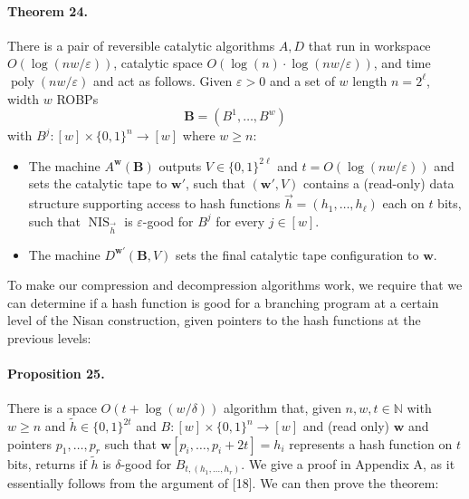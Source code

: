 \documentclass[10pt,a4paper]{article}
\begin{document}
\paragraph{Theorem 24.} There is a pair of reversible catalytic algorithms $A,D$ that run in workspace $O(\log(nw/\varepsilon))$, catalytic space $O(\log(n)\cdot\log(nw/\varepsilon))$, and time $\operatorname{poly}(nw/\varepsilon)$ and act as follows. Given $\varepsilon>0$ and a set of $w$ length $n=2^\ell$, width $w$ ROBPs
\[\mathbf B=(B^1,\ldots,B^w)\]
with $B^j:[w]\times\{0,1\}^n\to[w]$ where $w\geq n$:
\begin{itemize}
\item The machine $A^{\mathbf w}(\mathbf B)$ outputs $V\in\{0,1\}^{2\ell}$ and $t=O(\log(nw/\varepsilon))$ and sets the catalytic tape to $\mathbf w'$, such that $(\mathbf w',V)$ contains a (read-only) data structure supporting access to hash functions $\vec h=(h_1,\ldots,h_\ell)$ each on $t$ bits, such that $\operatorname{NIS}_{\vec h}$ is $\varepsilon$-good for $B^j$ for every $j\in[w]$.
\item The machine $D^{\mathbf w'}(\mathbf B,V)$ sets the final catalytic tape configuration to $\mathbf w$.
\end{itemize}
To make our compression and decompression algorithms work, we require that we can determine if a hash function is good for a branching program at a certain level of the Nisan construction, given pointers to the hash functions at the previous levels:
\paragraph{Proposition 25.} There is a space $O(t+\log(w/\delta))$ algorithm that, given $n,w,t\in\mathbb N$ with $w\geq n$ and $\widetilde h\in\{0,1\}^{2t}$ and $B:[w]\times\{0,1\}^n\to[w]$ and (read only) $\mathbf w$ and pointers $p_1,\ldots,p_r$ such that $\mathbf w[p_i,\ldots,p_i+2t]=h_i$ represents a hash function on $t$ bits, returns if $\widetilde h$ is $\delta$-good for $B_{t,(h_1,\ldots,h_r)}$.
We give a proof in Appendix A, as it essentially follows from the argument of [18]. We can then prove the theorem:
\end{document}
